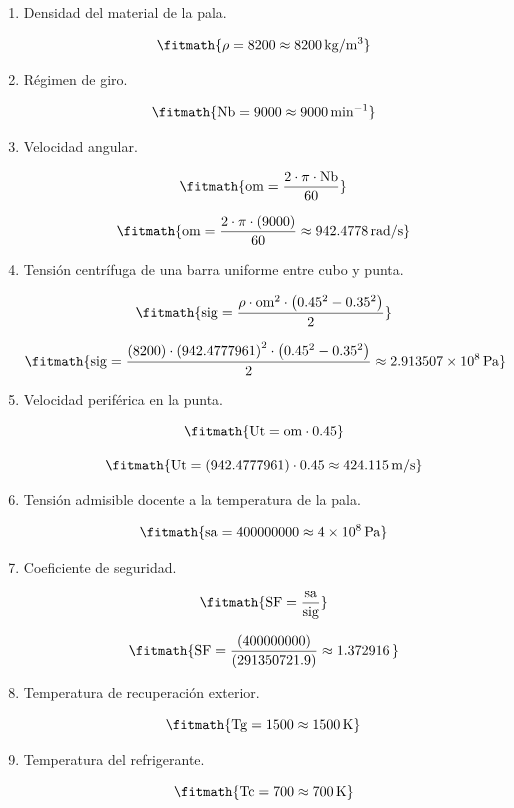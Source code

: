 \begin{enumerate}
\item Densidad del material de la pala.

\[\fitmath{\rho=8200\approx 8200\,\mathrm{kg/m^{3}}}\]

\item Régimen de giro.

\[\fitmath{\mathrm{Nb}=9000\approx 9000\,\mathrm{min^{-1}}}\]

\item Velocidad angular.

\[\fitmath{\mathrm{om}=\frac{2\cdot \pi\cdot \mathrm{Nb}}{60}}\]

\[\fitmath{\mathrm{om}=\frac{2\cdot \pi\cdot (9000)}{60}\approx 942.4778\,\mathrm{rad/s}}\]

\item Tensión centrífuga de una barra uniforme entre cubo y punta.

\[\fitmath{\mathrm{sig}=\frac{\rho\cdot {\mathrm{om}}^{2}\cdot \left({0.45}^{2}-{0.35}^{2}\right)}{2}}\]

\[\fitmath{\mathrm{sig}=\frac{(8200)\cdot {(942.4777961)}^{2}\cdot \left({0.45}^{2}-{0.35}^{2}\right)}{2}\approx 2.913507\times10^{8}\,\mathrm{Pa}}\]

\item Velocidad periférica en la punta.

\[\fitmath{\mathrm{Ut}=\mathrm{om}\cdot 0.45}\]

\[\fitmath{\mathrm{Ut}=(942.4777961)\cdot 0.45\approx 424.115\,\mathrm{m/s}}\]

\item Tensión admisible docente a la temperatura de la pala.

\[\fitmath{\mathrm{sa}=400000000\approx 4\times10^{8}\,\mathrm{Pa}}\]

\item Coeficiente de seguridad.

\[\fitmath{\mathrm{SF}=\frac{\mathrm{sa}}{\mathrm{sig}}}\]

\[\fitmath{\mathrm{SF}=\frac{(400000000)}{(291350721.9)}\approx 1.372916\,}\]

\item Temperatura de recuperación exterior.

\[\fitmath{\mathrm{Tg}=1500\approx 1500\,\mathrm{K}}\]

\item Temperatura del refrigerante.

\[\fitmath{\mathrm{Tc}=700\approx 700\,\mathrm{K}}\]


\end{enumerate}
